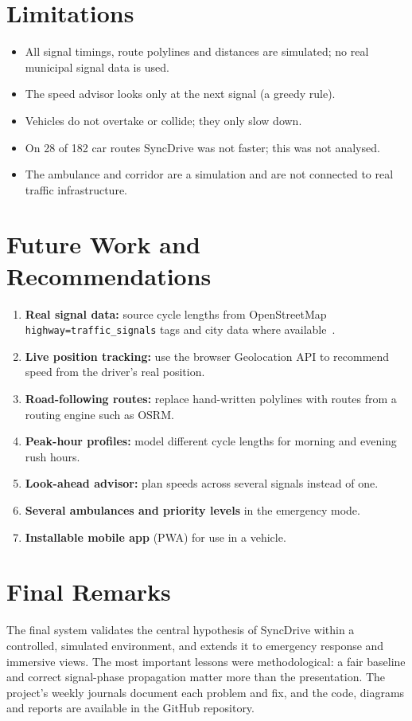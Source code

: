 \documentclass[12pt,a4paper]{report}
\begin{document}
\section{Limitations}

\begin{itemize}
  \item All signal timings, route polylines and distances are simulated; no
        real municipal signal data is used.
  \item The speed advisor looks only at the next signal (a greedy rule).
  \item Vehicles do not overtake or collide; they only slow down.
  \item On 28 of 182 car routes SyncDrive was not faster; this was not analysed.
  \item The ambulance and corridor are a simulation and are not connected to
        real traffic infrastructure.
\end{itemize}

\section{Future Work and Recommendations}

\begin{enumerate}
  \item \textbf{Real signal data:} source cycle lengths from OpenStreetMap
        \texttt{highway=traffic\_signals} tags and city data where
        available~\cite{OSM26}.
  \item \textbf{Live position tracking:} use the browser Geolocation API to
        recommend speed from the driver's real position.
  \item \textbf{Road-following routes:} replace hand-written polylines with
        routes from a routing engine such as OSRM.
  \item \textbf{Peak-hour profiles:} model different cycle lengths for morning
        and evening rush hours.
  \item \textbf{Look-ahead advisor:} plan speeds across several signals instead
        of one.
  \item \textbf{Several ambulances and priority levels} in the emergency mode.
  \item \textbf{Installable mobile app} (PWA) for use in a vehicle.
\end{enumerate}

\section{Final Remarks}

The final system validates the central hypothesis of SyncDrive within a
controlled, simulated environment, and extends it to emergency response and
immersive views. The most important lessons were methodological: a fair
baseline and correct signal-phase propagation matter more than the
presentation. The project's weekly journals document each problem and fix, and
the code, diagrams and reports are available in the GitHub repository.

\printbibliography[heading=bibintoc]
\end{document}
